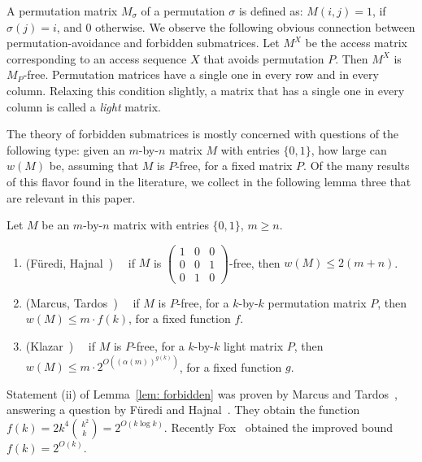 A permutation matrix $M_\sigma$ of a permutation $\sigma$ is defined as: $M(i,j) = 1$, if $\sigma(j) = i$, and 0 otherwise. We observe the following obvious connection between permutation-avoidance and forbidden submatrices. Let $M^X$ be the access matrix corresponding to an access sequence $X$ that avoids permutation $P$. Then $M^X$ is $M_P$-free. Permutation matrices have a single one in every row and in every column. Relaxing this condition slightly, a matrix that has a single one in every column is called a \emph{light} matrix.
 

The theory of forbidden submatrices is mostly concerned with questions of the following type: given an $m$-by-$n$ matrix $M$ with entries $\{0,1\}$, how large can $w(M)$ be, assuming that $M$ is $P$-free, for a fixed matrix $P$. Of the many results of this flavor found in the literature, we collect in the following lemma three that are relevant in this paper.

\begin{lemma}
\label{lem: forbidden}
Let $M$ be an $m$-by-$n$ matrix with entries $\{0,1\}$, $m \geq n$. 

\begin{enumerate}
\item (F\"{u}redi, Hajnal~\cite[Cor.\ 2.7]{furedi_hajnal})~~ if $M$ is $\left( \begin{matrix}
  1 & 0 & 0 \\
  0 & 0 & 1 \\
  0 & 1 & 0
 \end{matrix}\right)$-free, then $w(M) \leq 2(m+n)$.
\item (Marcus, Tardos~\cite{marcus_tardos})~~ if $M$ is $P$-free, for a $k$-by-$k$ permutation matrix $P$, then $w(M) \leq m \cdot f(k)$, for a fixed function $f$.
\item (Klazar~\cite{klazar})~~ if $M$ is $P$-free, for a $k$-by-$k$ light matrix $P$, then $w(M) \leq m \cdot 2^{O(({\alpha(m)})^{g(k)})}$, for a fixed function $g$. 
\end{enumerate} 
\end{lemma}

Statement (ii) of Lemma~\ref{lem: forbidden} was proven by Marcus and Tardos~\cite{marcus_tardos}, answering a question by F\"{u}redi and Hajnal~\cite{furedi_hajnal}. They obtain the function $f(k) = 2k^4\binom{\,k^2}{k} = 2^{O(k \log k)}$. Recently Fox~\cite{jfox} obtained the improved bound $f(k) = 2^{O(k)}$.

